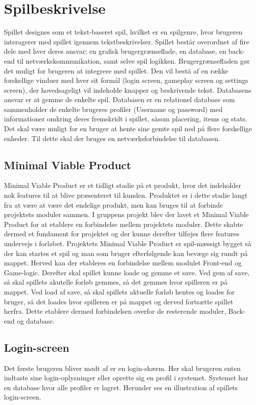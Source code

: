 \newpage

\section{Spilbeskrivelse}

Spillet designes som et tekst-baseret spil, hvilket er en spilgenre, hvor brugeren interagerer med spillet igennem tekstbeskrivelser. Spillet består overordnet af fire dele med hver deres ansvar; en grafisk brugergrænseflade, en database, en back-end til netværkskommunikation, samt selve spil logikken. Brugergrænsefladen gør det muligt for brugeren at integrere med spillet. Den vil bestå af en række forskellige vinduer med hver sit formål (login screen, gameplay screen og settings screen), der hovedsageligt vil indeholde knapper og beskrivende tekst. Databasens ansvar er at gemme de enkelte spil. Databasen er en relationel database som sammenholder de enkelte brugeres profiler (Username og password) med informationer omkring deres fremskridt i spillet, såsom placering, items og stats. Det skal være muligt for en bruger at hente sine gemte spil ned på flere forskellige enheder. Til dette skal der bruges en netværksforbindelse til databasen.   
\subsection{Minimal Viable Product}
Minimal Viable Product er et tidligt stadie på et produkt, hvor det indeholder nok features til at blive præsenteret til kunden. Produktet er i dette stadie langt fra at være at være det endelige produkt, men kan bruges til at forbinde projektets moduler sammen.
I gruppens projekt blev der lavet et Minimal Viable Product for at etablere en forbindelse mellem projektets moduler. Dette skabte dermed et fundament for projektet og der kunne derefter tilføjes flere features undervejs i forløbet.
Projektets Minimal Viable Product er spil-mæssigt bygget så der kan startes et spil og man som bruger efterfølgende kan bevæge sig rundt på mappet. Herved kan der etableres en forbindelse mellem modulet Front-end og Game-logic. Derefter skal spillet kunne loade og gemme et save. Ved gem af save, så skal spillets akutelle forløb gemmes, så det gemmes hvor spilleren er på mappet. Ved load af save, så skal spillets aktuelle forløb hentes og loades for bruger, så det loades hvor spilleren er på mappet og derved fortsætte spillet herfra. Dette etablere dermed forbindelsen overfor de resterende moduler, Back-end og database. 


\subsection{Login-screen}
Det første brugeren bliver mødt af er en login-skærm. Her skal brugeren enten indtaste sine login-oplysninger eller oprette sig en profil i systemet. Systemet har en database hvor alle profiler er lagret. Herunder ses en illustration af spillets login-screen. 

